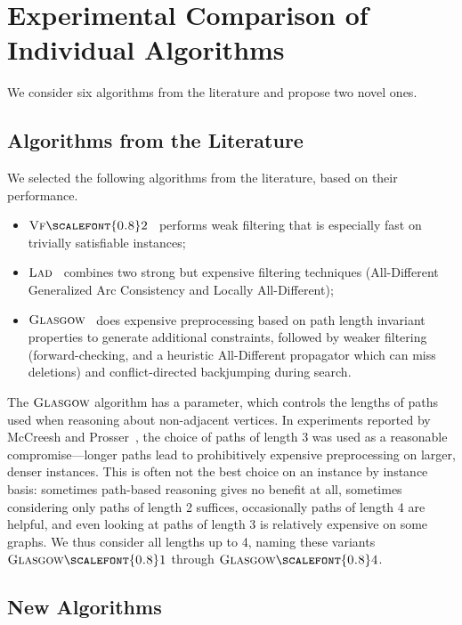 \documentclass{llncs}
\newcommand{\VFtwo}{$\textsc{Vf{\scalefont{0.8}2}}$\xspace}
\newcommand{\Glasgow}{$\textsc{Glasgow}$\xspace}
\newcommand{\LAD}{$\textsc{Lad}$\xspace}
\newcommand{\GlasgowOne}{$\textsc{Glasgow{\scalefont{0.8}1}}$\xspace}
\newcommand{\GlasgowFour}{$\textsc{Glasgow{\scalefont{0.8}4}}$\xspace}
\begin{document}
\section{Experimental Comparison of Individual Algorithms}\label{sec:exps}

We consider six algorithms from the literature and propose two novel ones.

\subsection{Algorithms from the Literature}

We selected the following algorithms from the literature, based on their
performance.
\begin{itemize}
\item \VFtwo{}~\cite{Cordella:2004} performs weak filtering that is especially fast on
    trivially satisfiable instances;
\item \LAD{}~\cite{Solnon:2010} combines two strong but expensive filtering techniques
    (All-Different Generalized Arc Consistency and Locally All-Different);
\item \Glasgow{}~\cite{McCreesh:2015} does expensive preprocessing based on path length
    invariant properties to generate additional constraints, followed by weaker filtering
    (forward-checking, and a heuristic All-Different propagator which can miss deletions) and
    conflict-directed backjumping during search.
\end{itemize}

\noindent The \Glasgow algorithm has a parameter, which controls the lengths of paths used when
reasoning about non-adjacent vertices.  In experiments reported by McCreesh and
Prosser~\cite{McCreesh:2015}, the choice of paths of length 3 was used as a reasonable compromise---longer
paths lead to prohibitively expensive preprocessing on larger, denser instances. This is often not
the best choice on an instance by instance basis: sometimes path-based reasoning gives no benefit at
all, sometimes considering only paths of length 2 suffices, occasionally paths of length 4 are
helpful, and even looking at paths of length 3 is relatively expensive on some graphs. We thus consider all
lengths up to 4, naming these variants \GlasgowOne through \GlasgowFour.

\subsection{New Algorithms}
\end{document}
